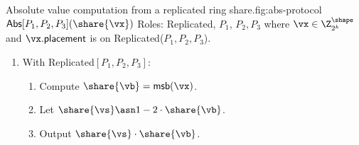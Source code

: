 \begin{Boxfig}{Absolute value computation from a replicated ring share.}{fig:abs-protocol}
  {$\mathsf{Abs}[P_1, P_2, P_3](\share{\vx})$}
  Roles: Replicated, $P_1$, $P_2, P_3$ where $\vx \in \Z_{2^k}^\shape$ and
  $\vx.\mathsf{placement}$ is on Replicated($P_1, P_2, P_3$).

  \begin{enumerate}
  \item With Replicated$[P_1, P_2, P_3]$:
  \begin{enumerate}
    \item Compute $\share{\vb} = \mathsf{msb}(\vx)$.
    \item Let $\share{\vs} \asn 1 - 2 \cdot \share{\vb}$.
    \item Output $\share{\vs} \cdot \share{\vb}$.
  \end{enumerate}
\end{enumerate}

\end{Boxfig}

